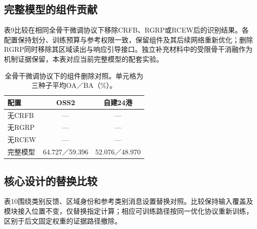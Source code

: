 \documentclass[journal,10pt,a4paper]{IEEEtran}
\begin{document}
\subsection{完整模型的组件贡献}\label{ux5b8cux6574ux6a21ux578bux7684ux7ec4ux4ef6ux8d21ux732e}

表9比较在相同全骨干微调协议下移除CRFB、RGRP或RCEW后的识别结果。各配置保持划分、训练预算与参考权限一致，保留组件及其后续网络重新优化；删除RGRP同时移除其区域读出与响应引导接口。独立补充材料中的受限骨干消融作为机制证据保留，本表对应当前完整模型的配套实验。

\begin{table}[H]
\centering\footnotesize
\setcounter{table}{8}
\caption{全骨干微调协议下的组件删除对照。单元格为三种子平均OA／BA（\%）。}
\label{tab:9}
\setlength{\tabcolsep}{3pt}\renewcommand{\arraystretch}{1.2}
\begin{tabularx}{\linewidth}{LCC}
\toprule
配置 & OSS2 & 自建24港 \\
\midrule
无CRFB & --- & --- \\
无RGRP & --- & --- \\
无RCEW & --- & --- \\
完整模型 & 64.727／59.396 & 52.076／48.970 \\
\bottomrule
\end{tabularx}
\end{table}

\subsection{核心设计的替换比较}\label{ux6838ux5fc3ux8bbeux8ba1ux7684ux66ffux6362ux6bd4ux8f83}

表10围绕类别反馈、区域身份和参考类别消息设置替换对照。比较保持输入覆盖及模块接入位置不变，仅替换指定计算；相应可训练路径按同一优化协议重新训练，区别于后文固定权重的证据路径撤除。
\end{document}
